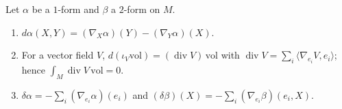 \begin{lemma}\label{hodge-theorem:lemma-codifferential-connection}
Let $\alpha$ be a $1$-form and $\beta$ a $2$-form on $M$.
\begin{enumerate}
\item $d\alpha(X, Y) = (\nabla_X\alpha)(Y) - (\nabla_Y\alpha)(X)$.
\item For a vector field $V$, $d(\iota_V\mathrm{vol}) = (\operatorname{div}V)\,\mathrm{vol}$ with $\operatorname{div}V = \sum_i\langle\nabla_{e_i}V, e_i\rangle$; hence $\int_M\operatorname{div}V\,\mathrm{vol} = 0$.
\item $\delta\alpha = -\sum_i(\nabla_{e_i}\alpha)(e_i)$ and $(\delta\beta)(X) = -\sum_i(\nabla_{e_i}\beta)(e_i, X)$.
\end{enumerate}
\end{lemma}

